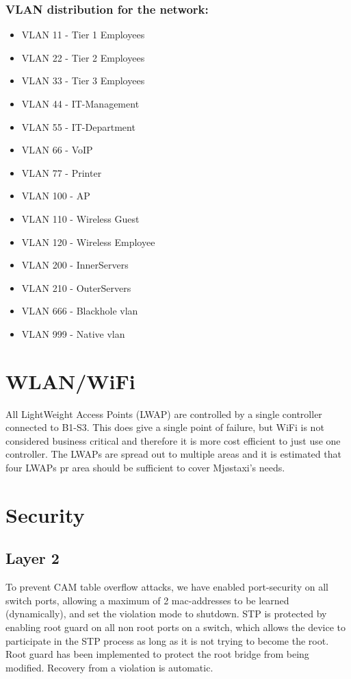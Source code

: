 \subsubsection*{VLAN distribution for the network: }
\vspace{-0.6em}
\begin{itemize}[noitemsep] 
    \item VLAN 11 - Tier 1 Employees
    \item VLAN 22 - Tier 2 Employees
    \item VLAN 33 - Tier 3 Employees 
    \item VLAN 44 - IT-Management
    \item VLAN 55 - IT-Department
    \item VLAN 66 - VoIP
    \item VLAN 77 - Printer
    \item VLAN 100 - AP
    \item VLAN 110 - Wireless Guest
    \item VLAN 120 - Wireless Employee
    \item VLAN 200 - InnerServers
    \item VLAN 210 - OuterServers
    \item VLAN 666 - Blackhole vlan
    \item VLAN 999 - Native vlan
\end{itemize}


\section{WLAN/WiFi}
All LightWeight Access Points (LWAP) are controlled by a single controller connected to B1-S3.
This does give a single point of failure, but WiFi is not considered business critical and therefore it is more cost efficient to just use one controller.
The LWAPs are spread out to multiple areas and it is estimated that four LWAPs pr area should be sufficient to cover Mjøstaxi's needs.


\section{Security}
\subsection{Layer 2}
To prevent CAM table overflow attacks, we have enabled port-security on all switch ports, allowing a maximum of 2 mac-addresses to be learned (dynamically), and set the violation mode to shutdown.
STP is protected by enabling root guard on all non root ports on a switch, which allows the device to participate in the STP process as long as it is not trying to become the root. Root guard has been implemented to protect the root bridge from being modified. Recovery from a violation is automatic.

